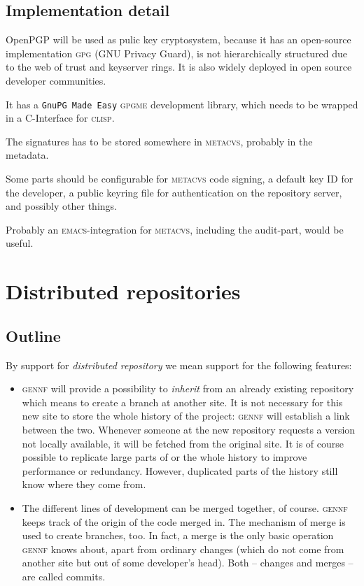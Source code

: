 \documentclass[fleqn, 10pt, a4paper]{article}
\begin{document}
\subsection{Implementation detail}
OpenPGP will be used as pulic key cryptosystem, because it has an
open-source implementation \textsc{gpg} (GNU Privacy Guard), is not
hierarchically structured due to the web of trust and keyserver rings.
It is also widely deployed in open source developer communities.

It has a \texttt{GnuPG Made Easy} \textsc{gpgme} development library,
which needs to be wrapped in a C-Interface for \textsc{clisp}.

The signatures has to be stored somewhere in \textsc{metacvs}, probably
in the metadata.

Some parts should be configurable for \textsc{metacvs} code signing,
a default key ID for the developer, a public keyring file for authentication
on the repository server, and possibly other things.

Probably an \textsc{emacs}-integration for \textsc{metacvs}, including the
audit-part, would be useful.


\section{Distributed repositories}

\subsection{Outline}

By support for \emph{distributed repository} we mean support for the following
features:

\begin{itemize}
\item \textsc{gennf} will provide a possibility to \emph{inherit} from an
already existing repository which means to create a branch
at another site. It is not necessary for this new site to store the
whole history of the project: \textsc{gennf} will establish a link between the two.
Whenever someone at the new repository requests a version not locally
available, it will be fetched from the original site. It is of course
possible to replicate large parts of or the whole history to improve
performance or redundancy. However, duplicated parts of the history still
know where they come from.

\item The different lines of development can be merged together, of course.
\textsc{gennf} keeps track of the origin of the code merged in. The mechanism
of merge is used to create branches, too. In fact, a merge is the only
basic operation \textsc{gennf} knows about, apart from ordinary changes (which
do not come from another site but out of some developer's head).
Both -- changes and merges -- are called commits.
\end{itemize}
\end{document}
